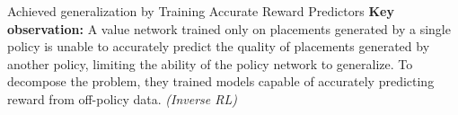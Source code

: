 \begin{frame}{Achieved generalization by Training Accurate Reward Predictors}
\textbf{Key observation:} A value network trained only on placements generated by a
single policy is unable to accurately predict the quality of placements generated by
another policy, limiting the ability of the policy network to generalize.
\vfill
To decompose the problem, they trained models capable of accurately predicting reward
from off-policy data. \textit{(Inverse RL)}
\end{frame}
